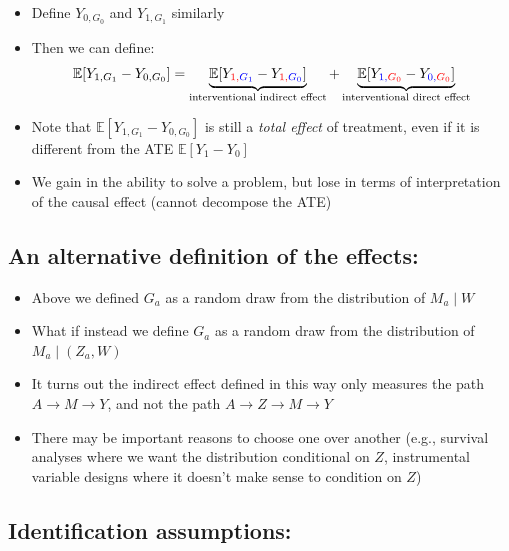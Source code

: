 \documentclass[
  12pt,
]{book}
\providecommand{\tightlist}{%
  \setlength{\itemsep}{0pt}\setlength{\parskip}{0pt}}
\theoremstyle{definition}
\theoremstyle{definition}
\theoremstyle{definition}
\newcommand{\E}{\mathbb{E}}
\newcommand{\1}{\mathbbm{1}}
\begin{document}
\begin{itemize}
\tightlist
\item
  Define \(Y_{0,G_0}\) and \(Y_{1,G_1}\) similarly
\item
  Then we can define:
  \begin{equation*}
  \E[Y_{1,G_1} - Y_{0,G_0}] = \underbrace{\E[Y_{\color{red}{1},\color{blue}{G_1}} -
      Y_{\color{red}{1},\color{blue}{G_0}}]}_{\text{interventional indirect effect}} +
      \underbrace{\E[Y_{\color{blue}{1},\color{red}{G_0}} -
      Y_{\color{blue}{0},\color{red}{G_0}}]}_{\text{interventional direct effect}}
  \end{equation*}
\item
  Note that \(\E[Y_{1,G_1} - Y_{0,G_0}]\) is still a \emph{total effect} of treatment,
  even if it is different from the ATE \(\E[Y_{1} - Y_{0}]\)
\item
  We gain in the ability to solve a problem, but lose in terms of interpretation
  of the causal effect (cannot decompose the ATE)
\end{itemize}

\hypertarget{an-alternative-definition-of-the-effects}{%
\subsection{An alternative definition of the effects:}\label{an-alternative-definition-of-the-effects}}

\begin{itemize}
\tightlist
\item
  Above we defined \(G_a\) as a random draw from the distribution of \(M_a \mid W\)
\item
  What if instead we define \(G_a\) as a random draw from the distribution of \(M_a \mid (Z_a,W)\)
\item
  It turns out the indirect effect defined in this way only measures the path
  \(A\rightarrow M \rightarrow Y\), and not the path \(A\rightarrow Z\rightarrow M \rightarrow Y\)
\item
  There may be important reasons to choose one over another (e.g., survival
  analyses where we want the distribution conditional on \(Z\), instrumental
  variable designs where it doesn't make sense to condition on \(Z\))
\end{itemize}

\hypertarget{identification-assumptions-2}{%
\subsection{Identification assumptions:}\label{identification-assumptions-2}}
\end{document}
